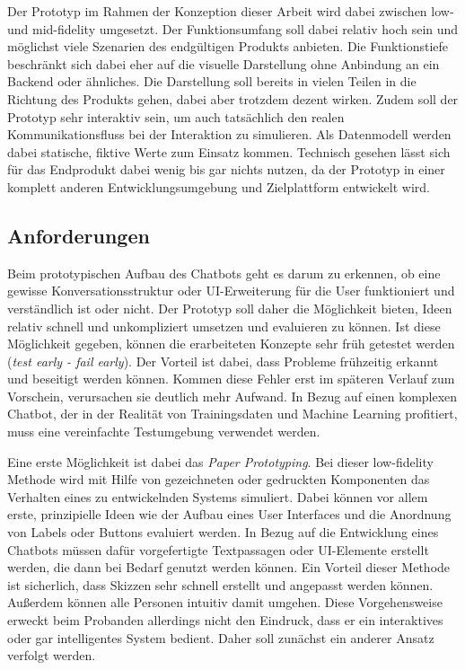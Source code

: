 Der Prototyp im Rahmen der Konzeption dieser Arbeit wird dabei zwischen low- und mid-fidelity umgesetzt. Der Funktionsumfang soll dabei relativ hoch sein und möglichst viele Szenarien des endgültigen Produkts anbieten. Die Funktionstiefe beschränkt sich dabei eher auf die visuelle Darstellung ohne Anbindung an ein Backend oder ähnliches. Die Darstellung soll bereits in vielen Teilen in die Richtung des Produkts gehen, dabei aber trotzdem dezent wirken. Zudem soll der Prototyp sehr interaktiv sein, um auch tatsächlich den realen Kommunikationsfluss bei der Interaktion zu simulieren. Als Datenmodell werden dabei statische, fiktive Werte zum Einsatz kommen. Technisch gesehen lässt sich für das Endprodukt dabei wenig bis gar nichts nutzen, da der Prototyp in einer komplett anderen Entwicklungsumgebung und Zielplattform entwickelt wird. 

\subsection{Anforderungen}
\label{subsec:anforderungen-prototyp}

Beim prototypischen Aufbau des Chatbots geht es darum zu erkennen, ob eine gewisse Konversationsstruktur oder \ac{UI}-Erweiterung für die User funktioniert und verständlich ist oder nicht. Der Prototyp soll daher die Möglichkeit bieten, Ideen relativ schnell und unkompliziert umsetzen und evaluieren zu können. Ist diese Möglichkeit gegeben, können die erarbeiteten Konzepte sehr früh getestet werden (\textit{test early - fail early}). Der Vorteil ist dabei, dass Probleme frühzeitig erkannt und beseitigt werden können. Kommen diese Fehler erst im späteren Verlauf zum Vorschein, verursachen sie deutlich mehr Aufwand. In Bezug auf einen komplexen Chatbot, der in der Realität von Trainingsdaten und Machine Learning profitiert, muss eine vereinfachte Testumgebung verwendet werden. 

Eine erste Möglichkeit ist dabei das \textit{Paper Prototyping}. Bei dieser low-fidelity Methode wird mit Hilfe von gezeichneten oder gedruckten Komponenten das Verhalten eines zu entwickelnden Systems simuliert. Dabei können vor allem erste, prinzipielle Ideen wie der Aufbau eines User Interfaces und die Anordnung von Labels oder Buttons evaluiert werden. In Bezug auf die Entwicklung eines Chatbots müssen dafür vorgefertigte Textpassagen oder \ac{UI}-Elemente erstellt werden, die dann bei Bedarf genutzt werden können. Ein Vorteil dieser Methode ist sicherlich, dass Skizzen sehr schnell erstellt und angepasst werden können. Außerdem können alle Personen intuitiv damit umgehen. Diese Vorgehensweise erweckt beim Probanden allerdings nicht den Eindruck, dass er ein interaktives oder gar intelligentes System bedient. Daher soll zunächst ein anderer Ansatz verfolgt werden. 

